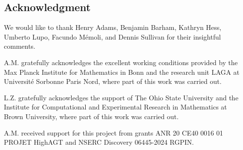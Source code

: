 
\subsection*{Acknowledgment}

We would like to thank Henry Adams, Benjamin Barham, Kathryn Hess, Umberto Lupo, Facundo M\'emoli, and Dennis Sullivan for their insightful comments.

A.M. gratefully acknowledges the excellent working conditions provided by the Max Planck Institute for Mathematics in Bonn and the research unit LAGA at Université Sorbonne Paris Nord, where part of this work was carried out.

L.Z. gratefully acknowledges the support of The Ohio State University and the Institute for Computational and Experimental Research in Mathematics at Brown University, where part of this work was carried out.

A.M. received support for this project from grants ANR 20 CE40 0016 01 PROJET HighAGT and NSERC Discovery 06445-2024 RGPIN.
